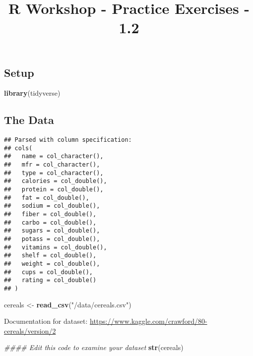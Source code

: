 \documentclass[]{article}
\title{R Workshop - Practice Exercises - 1.2}
\author{}
\date{}
\newenvironment{Shaded}{\begin{snugshade}}{\end{snugshade}}
\newcommand{\CommentTok}[1]{\textcolor[rgb]{0.56,0.35,0.01}{\textit{#1}}}
\newcommand{\KeywordTok}[1]{\textcolor[rgb]{0.13,0.29,0.53}{\textbf{#1}}}
\newcommand{\NormalTok}[1]{#1}
\newcommand{\StringTok}[1]{\textcolor[rgb]{0.31,0.60,0.02}{#1}}
\begin{document}
\maketitle

\hypertarget{setup}{%
\subsection{Setup}\label{setup}}

\begin{Shaded}
\begin{Highlighting}[]
\KeywordTok{library}\NormalTok{(tidyverse)}
\end{Highlighting}
\end{Shaded}

\hypertarget{the-data}{%
\subsection{The Data}\label{the-data}}

\begin{verbatim}
## Parsed with column specification:
## cols(
##   name = col_character(),
##   mfr = col_character(),
##   type = col_character(),
##   calories = col_double(),
##   protein = col_double(),
##   fat = col_double(),
##   sodium = col_double(),
##   fiber = col_double(),
##   carbo = col_double(),
##   sugars = col_double(),
##   potass = col_double(),
##   vitamins = col_double(),
##   shelf = col_double(),
##   weight = col_double(),
##   cups = col_double(),
##   rating = col_double()
## )
\end{verbatim}

\begin{Shaded}
\begin{Highlighting}[]
\NormalTok{cereals <-}\StringTok{ }\KeywordTok{read_csv}\NormalTok{(}\StringTok{"/data/cereals.csv"}\NormalTok{)}
\end{Highlighting}
\end{Shaded}

Documentation for dataset:
\url{https://www.kaggle.com/crawford/80-cereals/version/2}

\begin{Shaded}
\begin{Highlighting}[]
\CommentTok{#### Edit this code to examine your dataset}
\KeywordTok{str}\NormalTok{(cereals)}
\end{Highlighting}
\end{Shaded}
\end{document}
